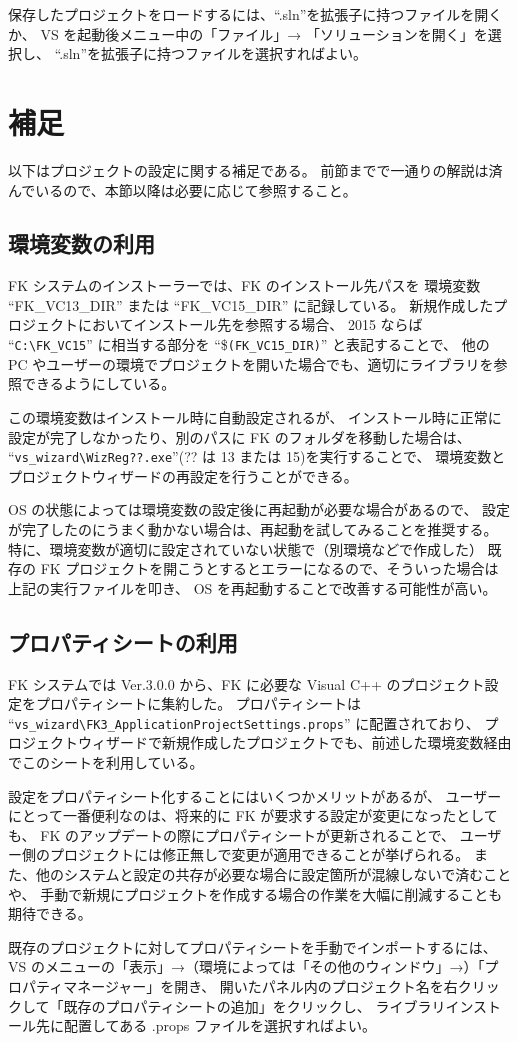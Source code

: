 \documentclass[a4j]{jarticle}
\begin{document}
保存したプロジェクトをロードするには、``.sln''を拡張子に持つファイルを開くか、
VS を起動後メニュー中の「ファイル」→ 「ソリューションを開く」を選択し、
``.sln''を拡張子に持つファイルを選択すればよい。

\appendix

\section{補足}
以下はプロジェクトの設定に関する補足である。
前節までで一通りの解説は済んでいるので、本節以降は必要に応じて参照すること。

\subsection{環境変数の利用}
FK システムのインストーラーでは、FK のインストール先パスを
環境変数 ``FK\_VC13\_DIR'' または ``FK\_VC15\_DIR'' に記録している。
新規作成したプロジェクトにおいてインストール先を参照する場合、
2015 ならば ``\verb+C:\FK_VC15+'' に相当する部分を ``\$\verb+(FK_VC15_DIR)+'' と表記することで、
他の PC やユーザーの環境でプロジェクトを開いた場合でも、適切にライブラリを参照できるようにしている。

この環境変数はインストール時に自動設定されるが、
インストール時に正常に設定が完了しなかったり、別のパスに FK のフォルダを移動した場合は、
``\verb+vs_wizard\WizReg??.exe+''(?? は 13 または 15)を実行することで、
環境変数とプロジェクトウィザードの再設定を行うことができる。

OS の状態によっては環境変数の設定後に再起動が必要な場合があるので、
設定が完了したのにうまく動かない場合は、再起動を試してみることを推奨する。
特に、環境変数が適切に設定されていない状態で（別環境などで作成した）
既存の FK プロジェクトを開こうとするとエラーになるので、そういった場合は上記の実行ファイルを叩き、
OS を再起動することで改善する可能性が高い。


\subsection{プロパティシートの利用}
FK システムでは Ver.3.0.0 から、FK に必要な Visual C++ のプロジェクト設定をプロパティシートに集約した。
プロパティシートは ``\verb+vs_wizard\FK3_ApplicationProjectSettings.props+'' に配置されており、
プロジェクトウィザードで新規作成したプロジェクトでも、前述した環境変数経由でこのシートを利用している。

設定をプロパティシート化することにはいくつかメリットがあるが、
ユーザーにとって一番便利なのは、将来的に FK が要求する設定が変更になったとしても、
FK のアップデートの際にプロパティシートが更新されることで、
ユーザー側のプロジェクトには修正無しで変更が適用できることが挙げられる。
また、他のシステムと設定の共存が必要な場合に設定箇所が混線しないで済むことや、
手動で新規にプロジェクトを作成する場合の作業を大幅に削減することも期待できる。

既存のプロジェクトに対してプロパティシートを手動でインポートするには、
VS のメニューの「表示」→（環境によっては「その他のウィンドウ」→）「プロパティマネージャー」を開き、
開いたパネル内のプロジェクト名を右クリックして「既存のプロパティシートの追加」をクリックし、
ライブラリインストール先に配置してある .props ファイルを選択すればよい。
\end{document}
